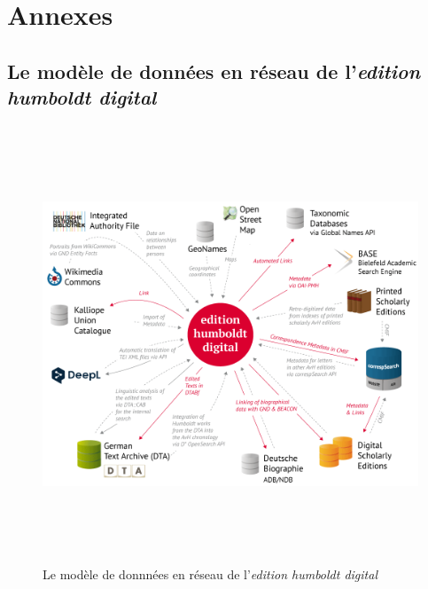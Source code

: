 \documentclass[a4paper, 12pt, twoside]{book}
\begin{document}
\printglossaries %
\listoffigures %
\listoftables

\appendix %
\part*{Annexes}

\chapter{Le modèle de données en réseau de l'\textit{edition humboldt digital}}
\begin{figure}[h!]
    \centering
         \includegraphics[angle=90,origin=c, height=13cm]{img/edition_humboldt_digital_v4_CC.png}
         \caption{Le modèle de donnnées en réseau de l'\textit{edition humboldt digital}}
         \label{fig:donneesReseau}
\end{figure}
\end{document}
